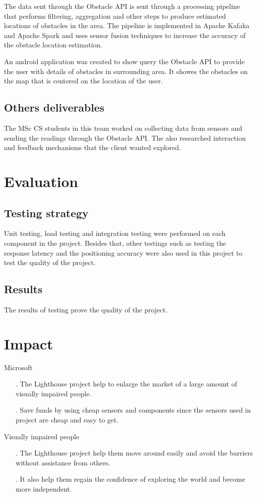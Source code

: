 \documentclass[prodmode,acmtosem]{acmsmall} %
\begin{document}
The data sent through the Obstacle API is sent through a processing pipeline that performs filtering, aggregation and other steps to produce estimated locations of obstacles in the area. The pipeline is implemented in Apache Kafaka and Apache Spark and uses sensor fusion techniques to increase the accuracy of the obstacle location estimation. 

An android application was created to show query the Obstacle API to provide the user with details of obstacles in surrounding area. It showes the obstacles on the map that is centered on the location of the user.

\subsection{Others deliverables}
The MSc CS students in this team worked on collecting data from sensors and sending the readings through the Obstacle API. The also researched interaction and feedback mechanisms that the client wanted explored.

\section{Evaluation}
\subsection{Testing strategy}
Unit testing, load testing and integration testing were performed on each component in the project. Besides that, other testings such as testing the response latency and the positioning accuracy were also used in this project to test the quality of the project.
\subsection{Results}
The results of testing prove the quality of the project. 
\section{Impact}
Microsoft
\begin{itemize}
\item[.] The Lighthouse project help to enlarge the market of a large amount of visually impaired people.
\item[.] Save funds by using cheap sensors and components since the sensors used in project are cheap and easy to get.
\end{itemize}
Visually impaired people
\begin{itemize}
\item[.] The Lighthouse project help them move around easily and avoid the barriers without assistance from others.
\item[.] It also help them regain the confidence of exploring the world and become more independent.
\end{itemize}
\end{document}
